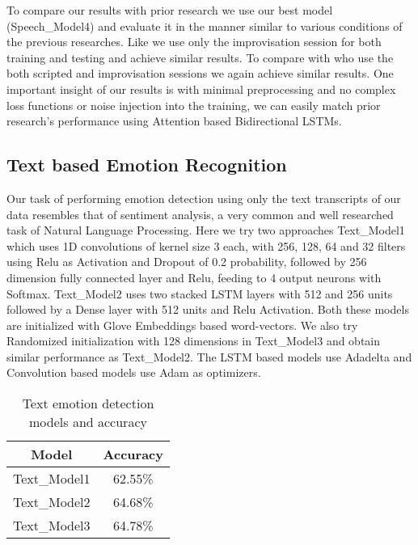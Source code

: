 \documentclass{article}
\begin{document}
To compare our results with prior research we use our best model (Speech\_Model4) and evaluate it in the manner similar to various conditions of the previous researches. Like \cite{Lee} we use only the improvisation session for both training and testing and achieve similar results. To compare with \cite{Chernykh} \cite{Neumann} \cite{Lakomkin} who use the both scripted and improvisation sessions we again achieve similar results. One important insight of our results is with minimal preprocessing and no complex loss functions or noise injection into the training, we can easily match prior research's performance using Attention based Bidirectional LSTMs. 

\subsection{Text based Emotion Recognition}
Our task of performing emotion detection using only the text transcripts of our data resembles that of sentiment analysis, a very common and well researched task of Natural Language Processing. Here we try two approaches Text\_Model1 which uses 1D convolutions of kernel size 3 each, with 256, 128, 64 and 32 filters using Relu as Activation and Dropout of 0.2 probability, followed by 256 dimension fully connected layer and Relu, feeding to 4 output neurons with Softmax. Text\_Model2 uses two stacked LSTM layers with 512 and 256 units followed by a Dense layer with 512 units and Relu Activation. Both these models are initialized with Glove Embeddings based word-vectors. We also try Randomized initialization with 128 dimensions in Text\_Model3 and obtain similar performance as Text\_Model2. The LSTM based models use Adadelta and Convolution based models use Adam as optimizers.


\begin{table}[!t]
\renewcommand{\arraystretch}{1.3}
\caption{Text emotion detection models and accuracy}
\label{table_text}
\centering
\begin{tabular}{|c||c|}
\hline
Model & Accuracy\\
\hline
Text\_Model1 & 62.55\% \\
Text\_Model2 & 64.68\%\\
Text\_Model3 & 64.78\%\\
\hline
\end{tabular}
\end{table}
\end{document}
